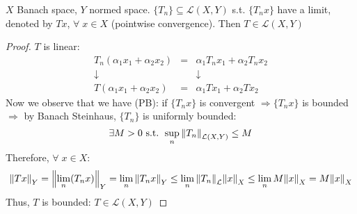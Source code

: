 \begin{corollary}
    \(X\) Banach space, \(Y\) normed space. \(\{ T_n \} \subseteq \mathcal{L}(X, Y)\) s.t. \(\{T_n x\}\) have a limit, denoted by \(Tx\), \(\forall \; x \in X\) (pointwise convergence). 
    Then \(T \in \mathcal{L}(X, Y)\)
\end{corollary}
\begin{proof}
    \(T\) is linear: 
    \[
        \begin{array}{ccc}
            T_n(\alpha_1 x_1 + \alpha_2 x_2 ) & = & \alpha_1 T_n x_1 + \alpha_2 T_n x_2 \\
            \downarrow && \downarrow \\
            T(\alpha_1 x_1 + \alpha_2 x_2) & = & \alpha_1 Tx_1 + \alpha_2 Tx_2
        \end{array}
    \]
    Now we observe that we have (PB): if \(\{ T_n x \}\) is convergent \(\Rightarrow \{T_n x\} \) is bounded \(\Rightarrow \) by Banach Steinhaus, \(\{ T_n \}\) is uniformly bounded: 
    \[
        \exists M>0 \text{ s.t. } \sup_n \norm{T_n}_{\mathcal{L}(X, Y)} \leq M 
    \]
    Therefore, \(\forall \; x \in X\):
    \[
        \norm{Tx}_Y = \norm{\lim_n (T_n x)}_Y = \lim_n \norm{T_n x}_Y \leq \lim_n \norm{T_n}_\mathcal{L} \norm{x}_X \leq \lim_n M \norm{x}_X  = M \norm{x}_X
    \]
    Thus, \(T\) is bounded: \(T \in \mathcal{L}(X, Y)\)
\end{proof}
